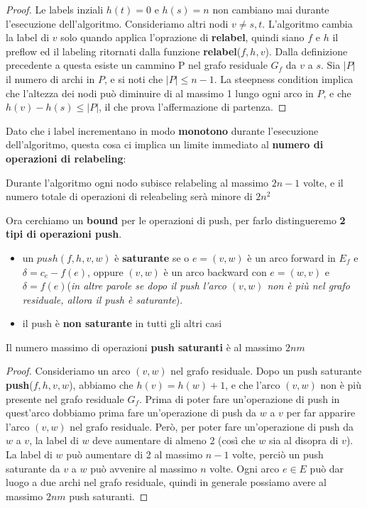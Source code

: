 \begin{proof}
	Le labels inziali $h(t) = 0$ e $h(s) = n$ non cambiano mai
	durante l'esecuzione dell'algoritmo. Consideriamo altri nodi $v \neq s, t$.
	L'algoritmo cambia la label di $v$ solo quando applica l'oprazione di
	\textbf{relabel}, quindi siano $f$ e $h$ il preflow ed il labeling ritornati
	dalla funzione \textbf{relabel}($f , h, v$). Dalla definizione precedente a
	questa esiste un cammino P nel grafo residuale $G_f$ da $v$ a $s$. Sia $|P|$ il
	numero di archi in $P$, e si noti che $|P| \leq n - 1$. La steepness condition
	implica che l'altezza dei nodi può diminuire di al massimo 1 lungo ogni arco in
	$P$, e che $h(v) - h(s) \leq |P|$, il che prova l'affermazione di partenza.
\end{proof}

Dato che i label incrementano in modo \textbf{monotono} durante l'esecuzione
dell'algoritmo, questa cosa ci implica un limite immediato al \textbf{numero di
	operazioni di relabeling}:

\begin{myblockquote}
	Durante l'algoritmo ogni nodo subisce relabeling al massimo $2n-1$ volte, e
	il numero totale di operazioni di releabeling serà minore di $2n^2$
\end{myblockquote}

Ora cerchiamo un \textbf{bound} per le operazioni di push, per farlo
distingueremo \textbf{2 tipi di operazioni push}.
\begin{itemize}
	\item un $push(f, h, v, w)$ è \textbf{saturante} se o $e = (v, w)$ è un arco
	      forward in $E_f$ e $\delta = c_e - f(e)$, oppure $(v,w)$ è un arco backward
	      con $e = (w,v)$ e $\delta = f(e)$(\textit{in altre parole se dopo il push
		      l'arco $(v,w)$ non è più nel grafo residuale, allora il push è saturante}).
	\item il push è \textbf{non saturante} in tutti gli altri casi
\end{itemize}

\begin{myblockquote}
	Il numero massimo di operazioni \textbf{push saturanti} è al massimo $2nm$
\end{myblockquote}

\begin{proof}
	Consideriamo un arco $(v, w)$ nel grafo residuale. Dopo un push saturante
	\textbf{push}($f, h, v, w$), abbiamo che $h(v) = h(w) + 1$, e che l'arco $(v,
		w)$ non è più presente nel grafo residuale $G_f$. Prima di poter fare
	un'operazione di push in quest'arco dobbiamo prima fare un'operazione di push da
	$w$ a $v$ per far apparire l'arco $(v, w)$ nel grafo residuale. Però, per poter
	fare un'operazione di push da $w$ a $v$, la label di $w$ deve aumentare di
	almeno 2 (così che $w$ sia al disopra di $v$). La label di $w$ può aumentare di
	2 al massimo $n - 1$ volte, perciò un push saturante da $v$ a $w$ può avvenire
	al massimo $n$ volte. Ogni arco $e \in E$ può dar luogo a due archi nel grafo
	residuale, quindi in generale possiamo avere al massimo $2nm$ push saturanti.
\end{proof}


